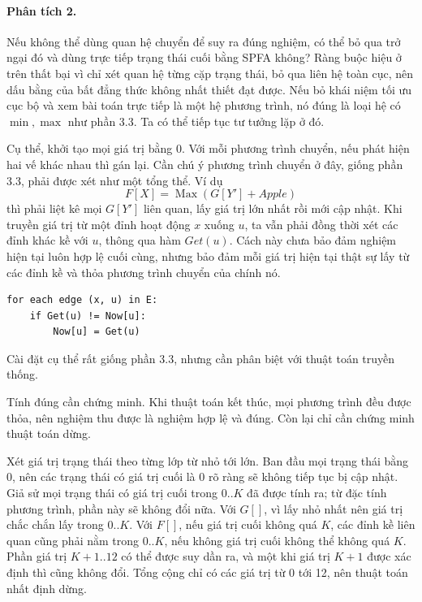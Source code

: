 \documentclass[11pt]{article}
\newcommand{\Max}{\operatorname{Max}}
\begin{document}
\paragraph{Phân tích 2.}
Nếu không thể dùng quan hệ chuyển để suy ra đúng nghiệm, có thể bỏ qua trở
ngại đó và dùng trực tiếp trạng thái cuối bằng SPFA không? Ràng buộc hiệu ở
trên thất bại vì chỉ xét quan hệ từng cặp trạng thái, bỏ qua liên hệ toàn cục,
nên dấu bằng của bất đẳng thức không nhất thiết đạt được. Nếu bỏ khái niệm tối
ưu cục bộ và xem bài toán trực tiếp là một hệ phương trình, nó đúng là loại hệ
có \(\min,\max\) như phần 3.3. Ta có thể tiếp tục tư tưởng lặp ở đó.

Cụ thể, khởi tạo mọi giá trị bằng 0. Với mỗi phương trình chuyển, nếu phát
hiện hai vế khác nhau thì gán lại. Cần chú ý phương trình chuyển ở đây, giống
phần 3.3, phải được xét như một tổng thể. Ví dụ
\[
  F[X]=\Max(G[Y']+\mathit{Apple})
\]
thì phải liệt kê mọi \(G[Y']\) liên quan, lấy giá trị lớn nhất rồi mới cập
nhật. Khi truyền giá trị từ một đỉnh hoạt động \(x\) xuống \(u\), ta vẫn phải
đồng thời xét các đỉnh khác kề với \(u\), thông qua hàm \(\mathit{Get}(u)\).
Cách này chưa bảo đảm nghiệm hiện tại luôn hợp lệ cuối cùng, nhưng bảo đảm
mỗi giá trị hiện tại thật sự lấy từ các đỉnh kề và thỏa phương trình chuyển
của chính nó.

\begin{verbatim}
for each edge (x, u) in E:
    if Get(u) != Now[u]:
        Now[u] = Get(u)
\end{verbatim}

Cài đặt cụ thể rất giống phần 3.3, nhưng cần phân biệt với thuật toán truyền
thống.

Tính đúng cần chứng minh. Khi thuật toán kết thúc, mọi phương trình đều được
thỏa, nên nghiệm thu được là nghiệm hợp lệ và đúng. Còn lại chỉ cần chứng minh
thuật toán dừng.

Xét giá trị trạng thái theo từng lớp từ nhỏ tới lớn. Ban đầu mọi trạng thái
bằng 0, nên các trạng thái có giá trị cuối là 0 rõ ràng sẽ không tiếp tục bị
cập nhật. Giả sử mọi trạng thái có giá trị cuối trong \(0..K\) đã được tính
ra; từ đặc tính phương trình, phần này sẽ không đổi nữa. Với \(G[]\), vì lấy
nhỏ nhất nên giá trị chắc chắn lấy trong \(0..K\). Với \(F[]\), nếu giá trị
cuối không quá \(K\), các đỉnh kề liên quan cũng phải nằm trong \(0..K\), nếu
không giá trị cuối không thể không quá \(K\). Phần giá trị \(K+1..12\) có thể
được suy dần ra, và một khi giá trị \(K+1\) được xác định thì cũng không đổi.
Tổng cộng chỉ có các giá trị từ 0 tới 12, nên thuật toán nhất định dừng.
\end{document}
